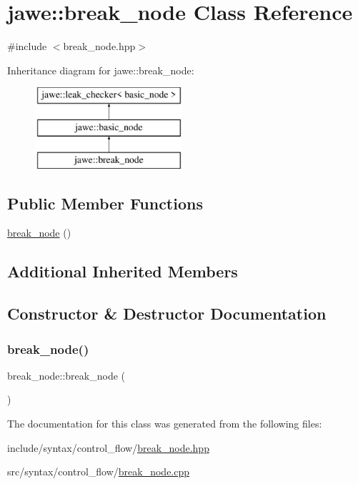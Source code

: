 \hypertarget{classjawe_1_1break__node}{}\section{jawe\+:\+:break\+\_\+node Class Reference}
\label{classjawe_1_1break__node}


{\ttfamily \#include $<$break\+\_\+node.\+hpp$>$}

Inheritance diagram for jawe\+:\+:break\+\_\+node\+:\begin{figure}[H]
\begin{center}
\leavevmode
\includegraphics[height=3.000000cm]{classjawe_1_1break__node}
\end{center}
\end{figure}
\subsection*{Public Member Functions}
\begin{DoxyCompactItemize}
\item 
\hyperlink{classjawe_1_1break__node_a7993d43d6ec51f1895c2a7351b931a5e}{break\+\_\+node} ()
\end{DoxyCompactItemize}
\subsection*{Additional Inherited Members}


\subsection{Constructor \& Destructor Documentation}
\mbox{\label{classjawe_1_1break__node_a7993d43d6ec51f1895c2a7351b931a5e}} 
\subsubsection{\texorpdfstring{break\+\_\+node()}{break\_node()}}
{\footnotesize\ttfamily break\+\_\+node\+::break\+\_\+node (\begin{DoxyParamCaption}{ }\end{DoxyParamCaption})}



The documentation for this class was generated from the following files\+:\begin{DoxyCompactItemize}
\item 
include/syntax/control\+\_\+flow/\hyperlink{break__node_8hpp}{break\+\_\+node.\+hpp}\item 
src/syntax/control\+\_\+flow/\hyperlink{break__node_8cpp}{break\+\_\+node.\+cpp}\end{DoxyCompactItemize}
